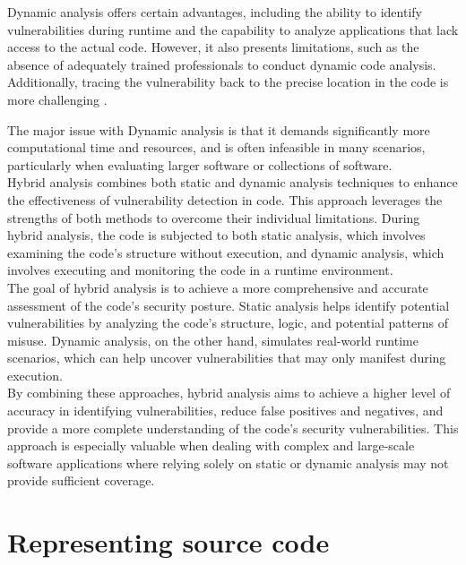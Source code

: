 Dynamic analysis offers certain advantages, including the ability to identify vulnerabilities during runtime and the capability to analyze applications that lack access to the actual code. However, it also presents limitations, such as the absence of adequately trained professionals to conduct dynamic code analysis. Additionally, tracing the vulnerability back to the precise location in the code is more challenging \cite{5066568}.

The major issue with Dynamic analysis is that it demands significantly more computational time and resources, and is often infeasible in many scenarios, particularly when evaluating larger software or collections of software.\\

Hybrid analysis combines both static and dynamic analysis techniques to enhance the effectiveness of vulnerability detection in code. This approach leverages the strengths of both methods to overcome their individual limitations. During hybrid analysis, the code is subjected to both static analysis, which involves examining the code's structure without execution, and dynamic analysis, which involves executing and monitoring the code in a runtime environment.\\

The goal of hybrid analysis is to achieve a more comprehensive and accurate assessment of the code's security posture. Static analysis helps identify potential vulnerabilities by analyzing the code's structure, logic, and potential patterns of misuse. Dynamic analysis, on the other hand, simulates real-world runtime scenarios, which can help uncover vulnerabilities that may only manifest during execution.\\

By combining these approaches, hybrid analysis aims to achieve a higher level of accuracy in identifying vulnerabilities, reduce false positives and negatives, and provide a more complete understanding of the code's security vulnerabilities. This approach is especially valuable when dealing with complex and large-scale software applications where relying solely on static or dynamic analysis may not provide sufficient coverage.




\section{Representing source code} %
\label{sec: Representig_source_code}

